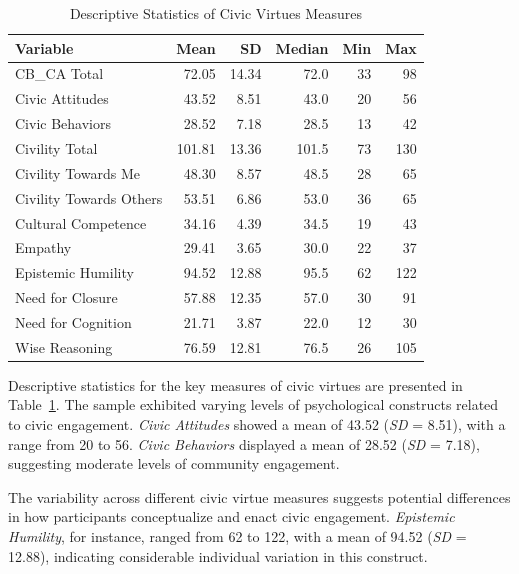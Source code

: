 \documentclass[
  man,
  floatsintext,
  longtable,
  nolmodern,
  notxfonts,
  notimes,
  colorlinks=true,linkcolor=blue,citecolor=blue,urlcolor=blue]{apa7}
\begin{document}
\begin{table}

{\caption{{Descriptive Statistics of Civic Virtues
Measures}{\label{tbl-descriptive-stats}}}
\vspace{-20pt}}

\begin{tabular}[t]{lrrrrr}
\toprule
Variable & Mean & SD & Median & Min & Max\\
\midrule
CB\_CA Total & 72.05 & 14.34 & 72.0 & 33 & 98\\
Civic Attitudes & 43.52 & 8.51 & 43.0 & 20 & 56\\
Civic Behaviors & 28.52 & 7.18 & 28.5 & 13 & 42\\
Civility Total & 101.81 & 13.36 & 101.5 & 73 & 130\\
Civility Towards Me & 48.30 & 8.57 & 48.5 & 28 & 65\\
\addlinespace
Civility Towards Others & 53.51 & 6.86 & 53.0 & 36 & 65\\
Cultural Competence & 34.16 & 4.39 & 34.5 & 19 & 43\\
Empathy & 29.41 & 3.65 & 30.0 & 22 & 37\\
Epistemic Humility & 94.52 & 12.88 & 95.5 & 62 & 122\\
Need for Closure & 57.88 & 12.35 & 57.0 & 30 & 91\\
\addlinespace
Need for Cognition & 21.71 & 3.87 & 22.0 & 12 & 30\\
Wise Reasoning & 76.59 & 12.81 & 76.5 & 26 & 105\\
\bottomrule
\end{tabular}

\end{table}

Descriptive statistics for the key measures of civic virtues are
presented in Table~\ref{tbl-descriptive-stats}. The sample exhibited
varying levels of psychological constructs related to civic engagement.
\emph{Civic Attitudes} showed a mean of 43.52 (\emph{SD} = 8.51), with a
range from 20 to 56. \emph{Civic Behaviors} displayed a mean of 28.52
(\emph{SD} = 7.18), suggesting moderate levels of community engagement.

The variability across different civic virtue measures suggests
potential differences in how participants conceptualize and enact civic
engagement. \emph{Epistemic Humility}, for instance, ranged from 62 to
122, with a mean of 94.52 (\emph{SD} = 12.88), indicating considerable
individual variation in this construct.
\end{document}
